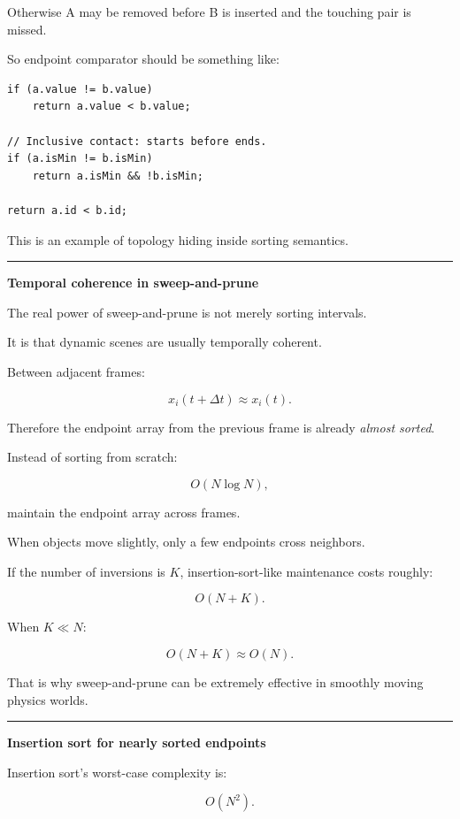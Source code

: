 Otherwise A may be removed before B is inserted and the touching pair is missed.

So endpoint comparator should be something like:

\begin{verbatim}
if (a.value != b.value)
    return a.value < b.value;

// Inclusive contact: starts before ends.
if (a.isMin != b.isMin)
    return a.isMin && !b.isMin;

return a.id < b.id;
\end{verbatim}

This is an example of topology hiding inside sorting semantics.

\begin{center}\rule{0.5\linewidth}{0.5pt}\end{center}

\textbf{Temporal coherence in sweep-and-prune}

The real power of sweep-and-prune is not merely sorting intervals.

It is that dynamic scenes are usually temporally coherent.

Between adjacent frames:

\[
x_i(t+\Delta t)
\approx
x_i(t).
\]

Therefore the endpoint array from the previous frame is already \emph{almost sorted}.

Instead of sorting from scratch:

\[
O(N\log N),
\]

maintain the endpoint array across frames.

When objects move slightly, only a few endpoints cross neighbors.

If the number of inversions is \(K\), insertion-sort-like maintenance costs roughly:

\[
O(N+K).
\]

When \(K\ll N\):

\[
O(N+K)\approx O(N).
\]

That is why sweep-and-prune can be extremely effective in smoothly moving physics worlds.

\begin{center}\rule{0.5\linewidth}{0.5pt}\end{center}

\textbf{Insertion sort for nearly sorted endpoints}

Insertion sort's worst-case complexity is:

\[
O(N^2).
\]

